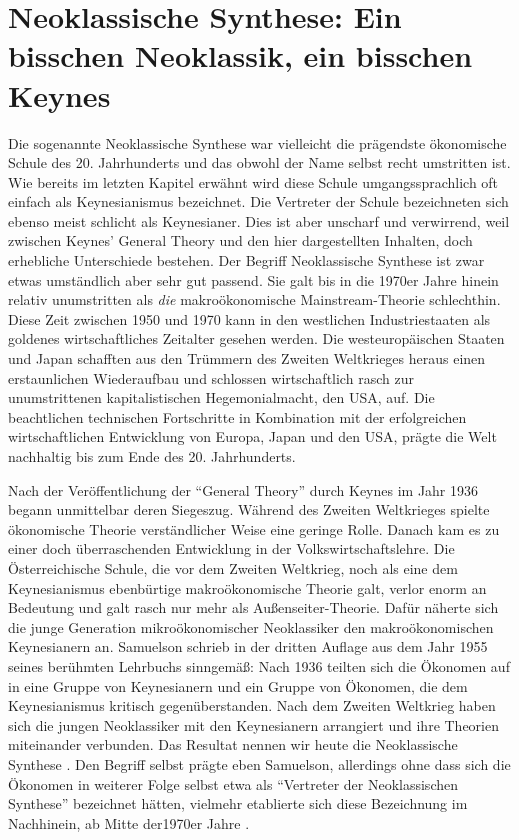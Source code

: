 %
%
%

\chapter{Neoklassische Synthese: Ein bisschen Neoklassik, ein bisschen Keynes}
\label{Synthese}

Die sogenannte Neoklassische Synthese war vielleicht die prägendste ökonomische Schule des 20. Jahrhunderts und das obwohl der Name selbst recht umstritten ist. Wie bereits im letzten Kapitel erwähnt wird diese Schule umgangssprachlich oft einfach als Keynesianismus bezeichnet. Die Vertreter der Schule bezeichneten sich ebenso meist schlicht als Keynesianer. Dies ist aber unscharf und verwirrend, weil zwischen Keynes' General Theory und den hier dargestellten Inhalten, doch erhebliche Unterschiede bestehen. Der Begriff Neoklassische Synthese ist zwar etwas umständlich aber sehr gut passend. Sie galt bis in die 1970er Jahre hinein relativ unumstritten als \textit{die} makroökonomische Mainstream-Theorie schlechthin. Diese Zeit zwischen 1950 und 1970 kann in den westlichen Industriestaaten als goldenes wirtschaftliches Zeitalter gesehen werden. Die westeuropäischen Staaten und Japan schafften aus den Trümmern des Zweiten Weltkrieges heraus einen erstaunlichen Wiederaufbau und schlossen wirtschaftlich rasch zur unumstrittenen kapitalistischen Hegemonialmacht, den USA, auf. Die beachtlichen technischen Fortschritte in Kombination mit der erfolgreichen wirtschaftlichen Entwicklung von Europa, Japan und den USA, prägte die Welt nachhaltig bis zum Ende des 20. Jahrhunderts.

Nach der Veröffentlichung der "`General Theory"' durch Keynes im Jahr 1936 begann unmittelbar deren Siegeszug. Während des Zweiten Weltkrieges spielte ökonomische Theorie verständlicher Weise eine geringe Rolle. Danach kam es zu einer doch überraschenden Entwicklung in der Volkswirtschaftslehre. Die Österreichische Schule, die vor dem Zweiten Weltkrieg, noch als eine dem Keynesianismus ebenbürtige makroökonomische Theorie galt, verlor enorm an Bedeutung und galt rasch nur mehr als Außenseiter-Theorie. Dafür näherte sich die junge Generation mikroökonomischer Neoklassiker den makroökonomischen Keynesianern an. Samuelson schrieb in der dritten Auflage aus dem Jahr 1955 seines berühmten Lehrbuchs \parencite{Samuelson1998} sinngemäß: Nach 1936 teilten sich die Ökonomen auf in eine Gruppe von Keynesianern und ein Gruppe von Ökonomen, die dem Keynesianismus kritisch gegenüberstanden. Nach dem Zweiten Weltkrieg haben sich die jungen Neoklassiker mit den Keynesianern arrangiert und ihre Theorien miteinander verbunden. Das Resultat nennen wir heute die Neoklassische Synthese \parencite[S. 46]{DeVroey2016}. Den Begriff selbst prägte eben Samuelson, allerdings ohne dass sich die Ökonomen in weiterer Folge selbst etwa als "`Vertreter der Neoklassischen Synthese"' bezeichnet hätten, vielmehr etablierte sich diese Bezeichnung im Nachhinein, ab Mitte der1970er Jahre \parencite{DeVroey2013}. 

